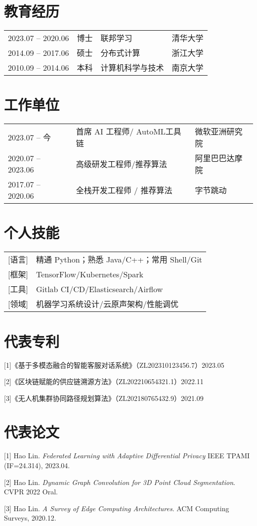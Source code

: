 \documentclass{cls/simplecv}
\begin{document}
\section{教育经历}

\begin{tabular}{llll}
	2023.07 -- 2020.06 & 博士 & 联邦学习 & 清华大学 \\ 
	2014.09 -- 2017.06 & 硕士 & 分布式计算 & 浙江大学\\
	2010.09 -- 2014.06 & 本科 & 计算机科学与技术 & 南京大学
\end{tabular}

\section{工作单位}
\begin{tabular}{lll}
    2023.07 -- 今 & 首席 AI 工程师/ AutoML工具链 & 微软亚洲研究院 \\
    2020.07 -- 2023.06 & 高级研发工程师/推荐算法 & 阿里巴巴达摩院\\
    2017.07 -- 2020.06 & 全栈开发工程师 / 推荐算法 & 字节跳动\\
\end{tabular}

\section{个人技能}
\begin{tabular}{ll}
	{[语言]} & 精通 Python；熟悉 Java/C++；常用 Shell/Git \\
	{[框架]} & TensorFlow/Kubernetes/Spark \\
	{[工具]} & Gitlab CI/CD/Elasticsearch/Airflow \\
	{[领域]} & 机器学习系统设计/云原声架构/性能调优
\end{tabular}

\section{代表专利}

[1]《基于多模态融合的智能客服对话系统》（ZL202310123456.7）2023.05

[2]《区块链赋能的供应链溯源方法》（ZL202210654321.1）2022.11

[3]《无人机集群协同路径规划算法》（ZL202180765432.9）2021.09


\section{代表论文}
[1] Hao Lin. \emph{Federated Learning with Adaptive Differential Privacy}
IEEE TPAMI (IF=24.314), 2023.04.

[2] Hao Lin. \emph{Dynamic Graph Convolution for 3D Point Cloud Segmentation}. CVPR 2022 Oral.

[3] Hao Lin. \emph{A Survey of Edge Computing Architectures}. ACM Computing Surveys, 2020.12.
\end{document}
